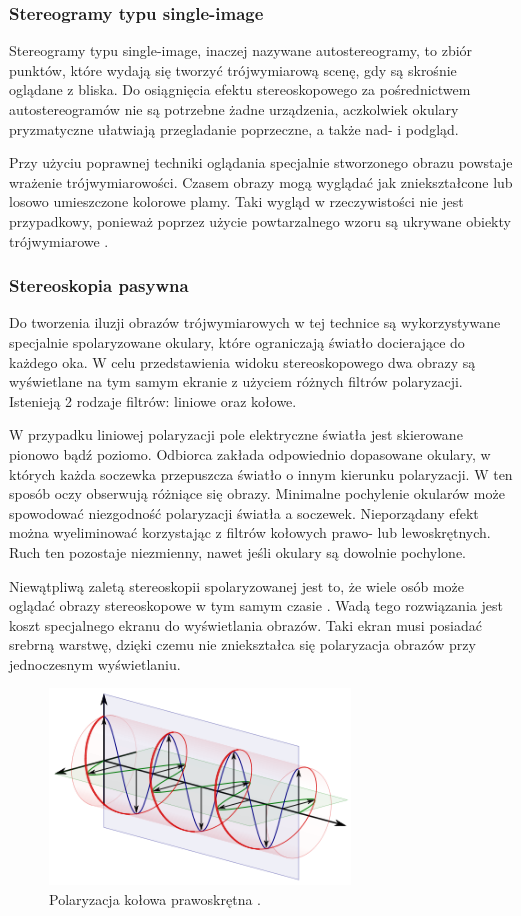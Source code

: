 \subsubsection{Stereogramy typu single-image} 
Stereogramy typu single-image, inaczej nazywane autostereogramy, to zbiór punktów, które wydają się tworzyć trójwymiarową scenę, gdy są skrośnie oglądane z bliska. Do osiągnięcia efektu stereoskopowego za pośrednictwem autostereogramów nie są potrzebne żadne urządzenia, aczkolwiek okulary pryzmatyczne ułatwiają przegladanie poprzeczne, a także nad- i podgląd.

Przy użyciu poprawnej techniki oglądania specjalnie stworzonego obrazu powstaje wrażenie trójwymiarowości. Czasem obrazy mogą wyglądać jak zniekształcone lub losowo umieszczone kolorowe plamy. Taki wygląd w rzeczywistości nie jest przypadkowy, ponieważ poprzez użycie powtarzalnego wzoru są ukrywane obiekty trójwymiarowe \cite{stereoscopythesis}.

\subsubsection{Stereoskopia pasywna} 
Do tworzenia iluzji obrazów trójwymiarowych w tej technice są wykorzystywane specjalnie spolaryzowane okulary, które ograniczają światło docierające do każdego oka. W celu przedstawienia widoku stereoskopowego dwa obrazy są wyświetlane na tym samym ekranie z użyciem różnych filtrów polaryzacji. Istenieją 2 rodzaje filtrów: liniowe oraz kołowe.

W przypadku liniowej polaryzacji pole elektryczne światła jest skierowane pionowo bądź poziomo. Odbiorca zakłada odpowiednio dopasowane okulary, w których każda soczewka przepuszcza światło o innym kierunku polaryzacji. W ten sposób oczy obserwują różniące się obrazy. Minimalne pochylenie okularów może spowodować niezgodność polaryzacji światła a soczewek. Nieporządany efekt można wyeliminować korzystając z filtrów kołowych prawo- lub lewoskrętnych. Ruch ten pozostaje niezmienny, nawet jeśli okulary są dowolnie pochylone.

Niewątpliwą zaletą stereoskopii spolaryzowanej jest to, że wiele osób może oglądać obrazy stereoskopowe w tym samym czasie \cite{russianpage}. Wadą tego rozwiązania jest koszt specjalnego ekranu do wyświetlania obrazów. Taki ekran musi posiadać srebrną warstwę, dzięki czemu nie zniekształca się polaryzacja obrazów przy jednoczesnym wyświetlaniu.
\begin{figure}[H]
		\centering
 		\includegraphics[width=8cm]{circular.png}
    	\caption{Polaryzacja kołowa prawoskrętna \cite{polarization}.}
 		\label{rys3}
\end{figure}


